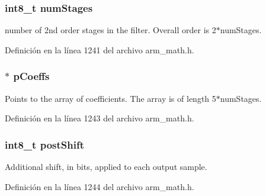 \subsubsection[{\texorpdfstring{num\+Stages}{numStages}}]{\setlength{\rightskip}{0pt plus 5cm}int8\+\_\+t num\+Stages}\hypertarget{structarm__biquad__casd__df1__inst__q15_af59c4ceb94f92d6613492b37e7c949de}{}\label{structarm__biquad__casd__df1__inst__q15_af59c4ceb94f92d6613492b37e7c949de}
number of 2nd order stages in the filter. Overall order is 2$\ast$num\+Stages. 

Definición en la línea 1241 del archivo arm\+\_\+math.\+h.

\subsubsection[{\texorpdfstring{p\+Coeffs}{pCoeffs}}]{$\ast$ p\+Coeffs}\hypertarget{structarm__biquad__casd__df1__inst__q15_a7ca181a37f714d174445f486bebce26f}{}\label{structarm__biquad__casd__df1__inst__q15_a7ca181a37f714d174445f486bebce26f}
Points to the array of coefficients. The array is of length 5$\ast$num\+Stages. 

Definición en la línea 1243 del archivo arm\+\_\+math.\+h.

\subsubsection[{\texorpdfstring{post\+Shift}{postShift}}]{\setlength{\rightskip}{0pt plus 5cm}int8\+\_\+t post\+Shift}\hypertarget{structarm__biquad__casd__df1__inst__q15_a3603cbf084938b6931bcb05dfe487f09}{}\label{structarm__biquad__casd__df1__inst__q15_a3603cbf084938b6931bcb05dfe487f09}
Additional shift, in bits, applied to each output sample. 

Definición en la línea 1244 del archivo arm\+\_\+math.\+h.

